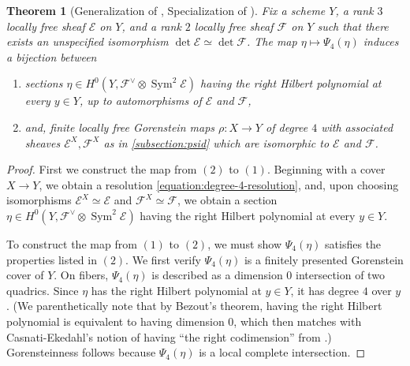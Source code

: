 \documentclass[12 pt]{amsart}
\theoremstyle{plain}
\newtheorem{theorem}[subsection]{Theorem}
\theoremstyle{definition}
\theoremstyle{remark}
\numberwithin{equation}{section}
\newcommand\bp{\mathbb P}
\newcommand\sce{\mathscr E}
\newcommand\scf{\mathscr F}
\newcommand \ra{\rightarrow}
\DeclareMathOperator\sym{Sym}
\begin{document}
\begin{theorem}[Generalization of , Specialization of {\cite[Thm. \ 1.1]{Wood2011}}] \label{theorem:4-structure}
	Fix a scheme $Y$, a rank $3$ locally free sheaf $\sce$ on $Y$, and a
	rank $2$ locally free sheaf $\scf$ on $Y$ such that there exists an
	unspecified isomorphism $\det \sce \simeq \det \scf$. The map $\eta
	\mapsto \Psi_4(\eta)$ induces a bijection between
	\begin{enumerate}
\item  sections $\eta \in H^0(Y,
	\scf^\vee \otimes \sym^2 \sce)$ having the right Hilbert polynomial at every $y
	\in Y$,
up to automorphisms of $\sce$ and $\scf$,
\item and, finite locally free Gorenstein maps $\rho:X \ra Y$ of degree $4$
	with associated sheaves $\sce^X, \scf^X$ as in \autoref{subsection:psid}
	which are isomorphic to $\sce$ and $\scf$.
	\end{enumerate}
\end{theorem} \begin{proof}
	First we construct the map from $(2)$ to $(1)$.
	Beginning with a cover $X \to Y$, we obtain a resolution
		\eqref{equation:degree-4-resolution}, and, upon choosing
		isomorphisms $\sce^X \simeq \sce$ and $\scf^X \simeq \scf$, we
		obtain a section $\eta \in H^0(Y, \scf^\vee \otimes \sym^2
		\sce)$ having the right Hilbert polynomial at every $y \in Y$.

		To construct the map from $(1)$ to $(2)$, we must show
		$\Psi_4(\eta)$ satisfies the properties listed in $(2)$.
		We first verify
	$\Psi_4(\eta)$ is a finitely presented Gorenstein cover of $Y$.  On
	fibers, $\Psi_4(\eta)$ is described as a dimension $0$ intersection
	of two quadrics. Since $\eta$ has the right Hilbert polynomial at $y \in Y$, it
	has degree $4$ over $y$.  
	(We parenthetically note that by Bezout's theorem, having the right
		Hilbert polynomial is equivalent to having dimension $0$, which
		then matches with Casnati-Ekedahl's notion of having
	“the right codimension” from \cite[Definition
4.2]{casnatiE:covers-algebraic-varieties}.)
	Gorensteinness follows because
	$\Psi_4(\eta)$ is a local complete intersection.  


\end{proof}
\end{document}
